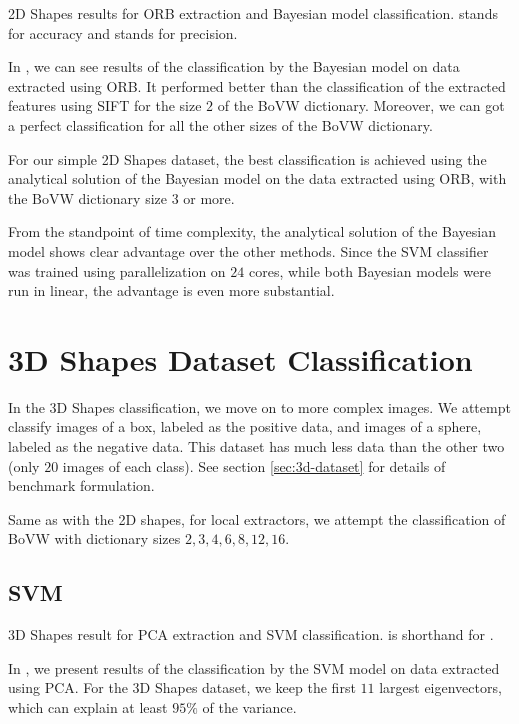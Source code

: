 \begin{table}[ht!]
    \centering
    
    \caption[2D Shapes results for ORB extraction and Bayesian model classification]{2D Shapes results for ORB extraction and Bayesian model classification.  stands for accuracy and  stands for precision.}
    \label{tab:2d_ORB_bayes}
\end{table}
In , we can see results of the classification by the Bayesian model on data extracted using ORB. It performed better than the classification of the extracted features using SIFT for the size $2$ of the BoVW dictionary. Moreover, we can got a perfect classification for all the other sizes of the BoVW dictionary.

For our simple 2D Shapes dataset, the best classification is achieved using the analytical solution of the Bayesian model on the data extracted using ORB, with the BoVW dictionary size $3$ or more.

From the standpoint of time complexity, the analytical solution of the Bayesian model shows clear advantage over the other methods. Since the SVM classifier was trained using parallelization on $24$ cores, while both Bayesian models were run in linear, the advantage is even more substantial.

\section{3D Shapes Dataset Classification}
In the 3D Shapes classification, we move on to more complex images. We attempt classify images of a box, labeled as the positive data, and images of a sphere, labeled as the negative data. This dataset has much less data than the other two (only $20$ images of each class). See section \ref{sec:3d-dataset} for details of benchmark formulation.

Same as with the 2D shapes, for local extractors, we attempt the classification of BoVW with dictionary sizes $2, 3, 4, 6, 8, 12, 16$.

\subsection{SVM}
\begin{table}[ht!]
    \centering
    
    \caption[3D Shapes result for PCA extraction and SVM classification]{3D Shapes result for PCA extraction and SVM classification.  is shorthand for .}
    \label{tab:3d_PCA_SVM}
\end{table}
In , we present results of the classification by the SVM model on data extracted using PCA. For the 3D Shapes dataset, we keep the first $11$ largest eigenvectors, which can explain at least $95\%$ of the variance.

